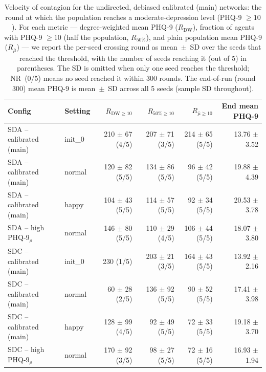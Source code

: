 \begin{table}[htbp]
\centering
\caption{Velocity of contagion for the undirected, debiased calibrated (main) networks: the round at which the population reaches a moderate-depression level (PHQ-9 $\geq 10$). For each metric --- degree-weighted mean PHQ-9 ($R_{\mathrm{DW}}$), fraction of agents with PHQ-9 $\geq 10$ (half the population, $R_{50\%}$), and plain population mean PHQ-9 ($R_{\bar{\mu}}$) --- we report the per-seed crossing round as mean~$\pm$~SD over the seeds that reached the threshold, with the number of seeds reaching it (out of 5) in parentheses. The SD is omitted when only one seed reaches the threshold; NR~(0/5) means no seed reached it within 300 rounds. The end-of-run (round 300) mean PHQ-9 is mean~$\pm$~SD across all 5 seeds (sample SD throughout).}
\label{tab:velocity_contagion}
\begin{tabular}{@{}llrrrr@{}}
\toprule
\textbf{Config} & \textbf{Setting} & \textbf{$R_{\mathrm{DW}\geq10}$} & \textbf{$R_{50\%\geq10}$} & \textbf{$R_{\bar{\mu}\geq10}$} & \textbf{End mean PHQ-9} \\
\midrule
SDA -- calibrated (main) & init\_0 & 210 $\pm$ 67 (4/5) & 207 $\pm$ 71 (3/5) & 214 $\pm$ 65 (5/5) & 13.76 $\pm$ 3.52 \\
SDA -- calibrated (main) & normal & 120 $\pm$ 82 (5/5) & 134 $\pm$ 86 (5/5) & 96 $\pm$ 42 (5/5) & 19.88 $\pm$ 4.39 \\
SDA -- calibrated (main) & happy & 104 $\pm$ 43 (5/5) & 114 $\pm$ 57 (5/5) & 92 $\pm$ 34 (5/5) & 20.53 $\pm$ 3.78 \\
SDA -- high PHQ-9$_\rho$ & normal & 146 $\pm$ 80 (5/5) & 110 $\pm$ 29 (4/5) & 106 $\pm$ 44 (5/5) & 18.07 $\pm$ 3.80 \\
SDC -- calibrated (main) & init\_0 & 230 (1/5) & 203 $\pm$ 21 (3/5) & 164 $\pm$ 43 (5/5) & 13.92 $\pm$ 2.16 \\
SDC -- calibrated (main) & normal & 60 $\pm$ 28 (2/5) & 136 $\pm$ 92 (5/5) & 90 $\pm$ 52 (5/5) & 17.41 $\pm$ 3.98 \\
SDC -- calibrated (main) & happy & 128 $\pm$ 99 (4/5) & 92 $\pm$ 49 (5/5) & 72 $\pm$ 33 (5/5) & 19.18 $\pm$ 3.70 \\
SDC -- high PHQ-9$_\rho$ & normal & 170 $\pm$ 92 (3/5) & 98 $\pm$ 27 (5/5) & 72 $\pm$ 16 (5/5) & 16.93 $\pm$ 1.94 \\
\bottomrule
\end{tabular}
\end{table}

